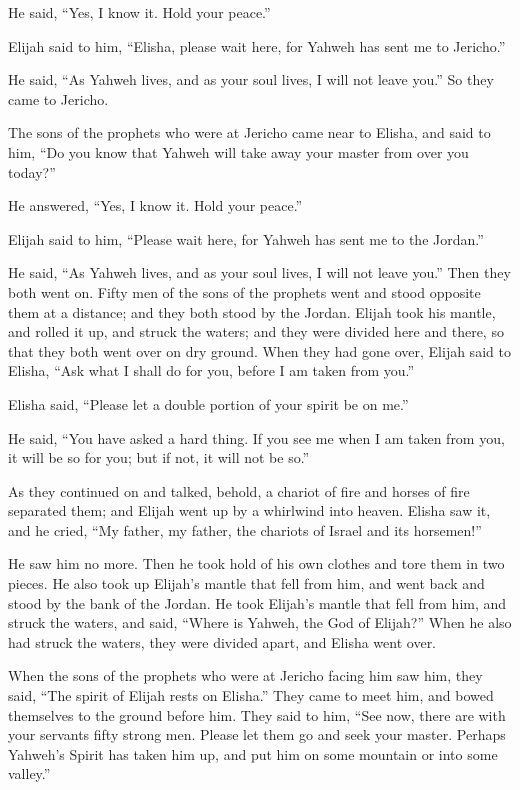 He said, ``Yes, I know it. Hold your peace.''

 Elijah said to him, ``Elisha, please wait here, for
Yahweh has sent me to Jericho.''

He said, ``As Yahweh lives, and as your soul lives, I will not leave
you.'' So they came to Jericho.

 The sons of the prophets who were at Jericho came near to
Elisha, and said to him, ``Do you know that Yahweh will take away your
master from over you today?''

He answered, ``Yes, I know it. Hold your peace.''

 Elijah said to him, ``Please wait here, for Yahweh has
sent me to the Jordan.''

He said, ``As Yahweh lives, and as your soul lives, I will not leave
you.'' Then they both went on.  Fifty men of the sons of
the prophets went and stood opposite them at a distance; and they both
stood by the Jordan.  Elijah took his mantle, and rolled
it up, and struck the waters; and they were divided here and there, so
that they both went over on dry ground.  When they had
gone over, Elijah said to Elisha, ``Ask what I shall do for you, before
I am taken from you.''

Elisha said, ``Please let a double portion of your spirit be on me.''

 He said, ``You have asked a hard thing. If you see me
when I am taken from you, it will be so for you; but if not, it will not
be so.''

 As they continued on and talked, behold, a chariot of
fire and horses of fire separated them; and Elijah went up by a
whirlwind into heaven.  Elisha saw it, and he cried, ``My
father, my father, the chariots of Israel and its horsemen!''

He saw him no more. Then he took hold of his own clothes and tore them
in two pieces.  He also took up Elijah's mantle that fell
from him, and went back and stood by the bank of the Jordan.
 He took Elijah's mantle that fell from him, and struck
the waters, and said, ``Where is Yahweh, the God of Elijah?'' When he
also had struck the waters, they were divided apart, and Elisha went
over.

 When the sons of the prophets who were at Jericho facing
him saw him, they said, ``The spirit of Elijah rests on Elisha.'' They
came to meet him, and bowed themselves to the ground before him.
 They said to him, ``See now, there are with your
servants fifty strong men. Please let them go and seek your master.
Perhaps Yahweh's Spirit has taken him up, and put him on some mountain
or into some valley.''

